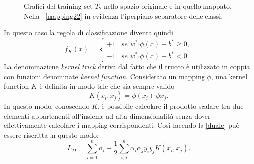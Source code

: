 \documentclass [11pt,a4paper,twoside,openright] {book}
\begin{document}
\begin{figure}[!h]
        \centering%
        \qquad\qquad
          \caption{Grafici del training set $T_2$ nello spazio originale e in quello mappato. Nella \figurename~\ref{mapping22} in evidenza l'iperpiano separatore delle classi.}
\end{figure}
\linebreak
In questo caso la regola di classificazione diventa quindi
\[
f_K(x)=
\begin{cases}
+1 & \textit{se } w^* \boldsymbol{\cdot} \phi(x) + b^* \geq 0, \\
-1 & \textit{se } w^* \boldsymbol{\cdot} \phi(x)  + b^*< 0.
\end{cases}
\]
La denominazione \textit{kernel trick} deriva dal fatto che il trucco è utilizzato in coppia con funzioni denominate \textit{kernel function}\cite{giannelli}. Considerato un mapping $\phi$, una kernel function $K$ è definita in modo tale che sia sempre valido
\[
K(x_i,x_j) = \phi(x_i) \boldsymbol{\cdot} \phi{x_j}.
\]
In questo modo, conoscendo $K$, è possibile calcolare il prodotto scalare tra due elementi appartenenti all'insieme ad alta dimensionalità senza dover effettivamente calcolare i mapping corrispondenti. Così facendo la \ref{duale} può essere riscritta in questo modo:
\[
L_D = \sum_{i=1}^n \alpha_i -\dfrac{1}{2} \sum_{i,j}^n \alpha_i \alpha_j y_i y_j K(x_i,x_j).
\]
\end{document}
